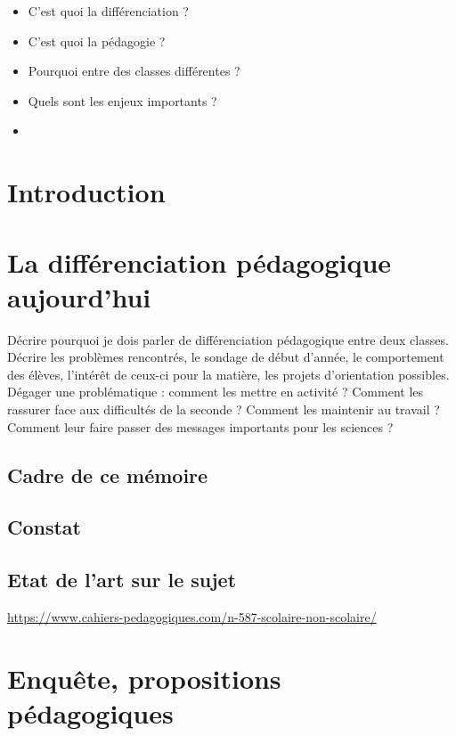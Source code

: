 \tableofcontents

\begin{itemize}
    \item C'est quoi la différenciation ?
    \item C'est quoi la pédagogie ?
    \item Pourquoi entre des classes différentes ?
    \item Quels sont les enjeux importants ?
    \item 
\end{itemize}

\section{Introduction}

\section{La différenciation pédagogique aujourd'hui}
Décrire pourquoi je dois parler de différenciation pédagogique entre deux classes.\\
Décrire les problèmes rencontrés, le sondage de début d'année, le comportement des élèves, l'intérêt de ceux-ci pour la matière, les projets d'orientation possibles.\\

Dégager une problématique : comment les mettre en activité ? Comment les rassurer face aux difficultés de la seconde ? Comment les maintenir au travail ? Comment leur faire passer des messages importants pour les sciences ?\\
\subsection{Cadre de ce mémoire}

\subsection{Constat}

\subsection{Etat de l'art sur le sujet}
\url{https://www.cahiers-pedagogiques.com/n-587-scolaire-non-scolaire/}
\cite{cahierpeda589}%
\section{Enquête, propositions pédagogiques}
